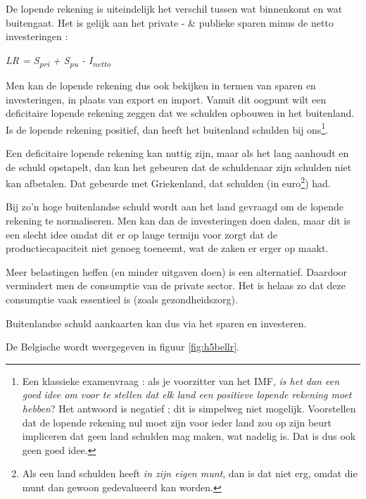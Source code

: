 \par De lopende rekening is uiteindelijk het verschil tussen wat binnenkomt en wat buitengaat. Het is gelijk aan het private - \& publieke sparen minus de netto investeringen :
\begin{leftbar}
\textit{LR = S\textsubscript{pri} + S\textsubscript{pu} - I\textsubscript{netto}}
\end{leftbar}
Men kan de lopende rekening dus ook bekijken in termen van sparen en investeringen, in plaats van export en import. Vanuit dit oogpunt wilt een deficitaire lopende rekening zeggen dat we schulden opbouwen in het buitenland. Is de lopende rekening positief, dan heeft het buitenland schulden bij ons\footnote{Een klassieke examenvraag : als je voorzitter van het IMF, \textit{is het dan een goed idee om voor te stellen dat elk land een positieve lopende rekening moet hebben}? Het antwoord is negatief ; dit is simpelweg niet mogelijk. Voorstellen dat de lopende rekening nul moet zijn voor ieder land zou op zijn beurt impliceren dat geen land schulden mag maken, wat nadelig is. Dat is dus ook geen goed idee.}.\\

\par Een deficitaire lopende rekening kan nuttig zijn, maar als het lang aanhoudt en de schuld opstapelt, dan kan het gebeuren dat de schuldenaar zijn schulden niet kan afbetalen. Dat gebeurde met Griekenland, dat schulden (in euro\footnote{Als een land schulden heeft \textit{in zijn eigen munt}, dan is dat niet erg, omdat die munt dan gewoon gedevalueerd kan worden.}) had.
\par Bij zo'n hoge buitenlandse schuld wordt aan het land gevraagd om de lopende rekening te normaliseren. Men kan dan de investeringen doen dalen, maar dit is een slecht idee omdat dit er op lange termijn voor zorgt dat de productiecapaciteit niet genoeg toeneemt, wat de zaken er erger op maakt.\\
\par Meer belastingen heffen (en minder uitgaven doen) is een alternatief. Daardoor vermindert men de consumptie van de private sector. Het is helaas zo dat deze consumptie vaak essentieel is (zoals gezondheidszorg).
\par Buitenlandse schuld aankaarten kan dus via het sparen en investeren.\\

\par De Belgische  wordt weergegeven in figuur \ref{fig:h5bellr}.

